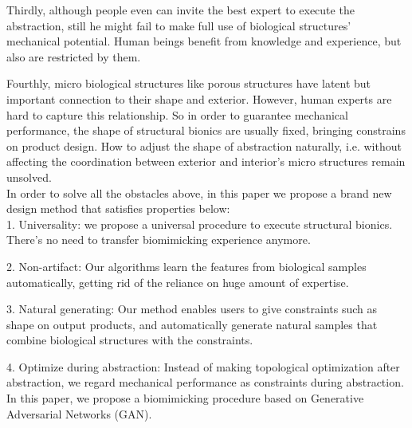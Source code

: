 Thirdly, although people even can invite the best expert to execute the abstraction, still he might fail to make full use of biological structures’ mechanical potential. Human beings benefit from knowledge and experience, but also are restricted by them.

Fourthly, micro biological structures like porous structures have latent but important connection to their shape and exterior. However, human experts are hard to capture this relationship. So in order to guarantee mechanical performance, the shape of structural bionics are usually fixed, bringing constrains on product design. How to adjust the shape of abstraction naturally, i.e. without affecting the coordination between exterior and interior’s micro structures remain unsolved.\\

In order to solve all the obstacles above, in this paper we propose a brand new design method that satisfies properties below: \\

1. Universality: we propose a universal procedure to execute structural bionics. There’s no need to transfer biomimicking experience anymore.

2. Non-artifact: Our algorithms learn the features from biological samples automatically, getting rid of the reliance on huge amount of expertise. 

3. Natural generating: Our method enables users to give constraints such as shape on output products, and automatically generate natural samples that combine biological structures with the constraints. 

4. Optimize during abstraction: Instead of making topological optimization after abstraction, we regard mechanical performance as constraints during abstraction.\\

In this paper, we propose a biomimicking procedure based on Generative Adversarial Networks (GAN). 


